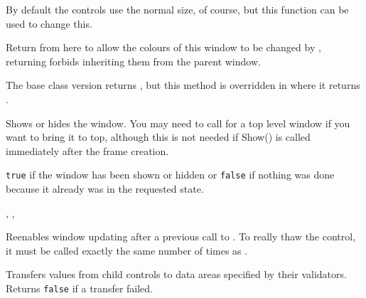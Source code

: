 By default the controls use the normal size, of course, but this function can
be used to change this.


\label{wxwindowshouldinheritcolours}


Return \true from here to allow the colours of this window to be changed by
, returning \false
forbids inheriting them from the parent window.

The base class version returns \false, but this method is overridden in
 where it returns \true.


\label{wxwindowshow}


Shows or hides the window. You may need to call 
for a top level window if you want to bring it to top, although this is not
needed if Show() is called immediately after the frame creation.




{\tt true} if the window has been shown or hidden or {\tt false} if nothing was
done because it already was in the requested state.


,\rtfsp
{},\rtfsp
{}


\label{wxwindowthaw}


Reenables window updating after a previous call to
. To really thaw the control, it must be called
exactly the same number of times as .


\label{wxwindowtransferdatafromwindow}


Transfers values from child controls to data areas specified by their validators. Returns
{\tt false} if a transfer failed.

